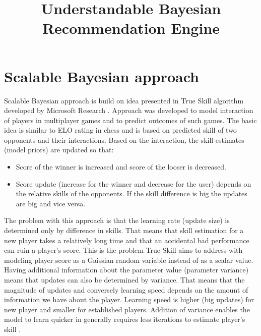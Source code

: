 \documentclass{article}
\title{Understandable Bayesian Recommendation Engine}
\begin{document}
\maketitle

 

\section{Scalable Bayesian approach}
Scalable Bayesian approach is build on idea presented in True Skill algorithm developed by Microsoft Research \cite{TrueSkill}. Approach was developed to model interaction of players in multiplayer games and to predict outcomes of such games. The basic idea is similar to ELO rating in chess and is based on predicted skill of two opponents and their interactions.  Based on the interaction, the skill estimates (model priors) are updated so that:
\begin{itemize}
\item{Score of the winner is increased and score of the looser is decreased.}
\item{Score update (increase for the winner and decrease for the user) depends on the relative skills of the opponents. If the skill difference is big the updates are big and vice versa.}
\end{itemize}
The problem with this approach is that the learning rate (update size) is determined only by difference in skills. That means that skill estimation for a new player takes a relatively long time and that an accidental bad performance can ruin a player's score. This is the problem True Skill aims to address with modeling player score as a Gaissian random variable instead of as a scalar value. Having additional information about the parameter value (parameter variance) means that updates can also be determined by variance. That means that the magnitude of updates and conversely learning speed depends on the amount of information we have about the player. Learning speed is higher (big updates) for new player and smaller for established players. Addition of variance enables the model to learn quicker in generally requires less iterations to estimate player's skill \cite{TrueSkill}.
\end{document}
